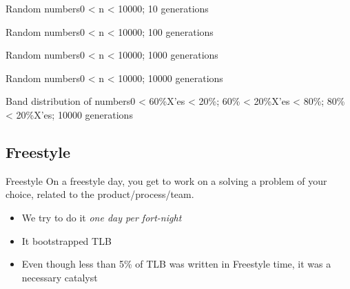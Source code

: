 \documentclass{beamer}
\begin{document}
\begin{frame}{Random numbers}{0 < n < 10000; 10 generations}
  \begin{centering}
  \end{centering}
\end{frame}

\begin{frame}{Random numbers}{0 < n < 10000; 100 generations}
  \begin{centering}
  \end{centering}
\end{frame}

\begin{frame}{Random numbers}{0 < n < 10000; 1000 generations}
  \begin{centering}
  \end{centering}
\end{frame}

\begin{frame}{Random numbers}{0 < n < 10000; 10000 generations}
  \begin{centering}
  \end{centering}
\end{frame}

\begin{frame}{Band distribution of numbers}{0 < 60\%X'es < 20\%; 60\% < 20\%X'es < 80\%; 80\% < 20\%X'es; 10000 generations}
  \begin{centering}
  \end{centering}
\end{frame}

\subsection{Freestyle}

\begin{frame}{Freestyle}
  On a freestyle day, you get to work on a solving a problem of your choice, related to the product/process/team.
  \begin{itemize}
    \item We try to do it \emph{one day per fort-night}
    \item It bootstrapped TLB
    \item Even though less than 5\% of TLB was written in Freestyle time, it was a necessary catalyst
  \end{itemize}
\end{frame}
\end{document}
